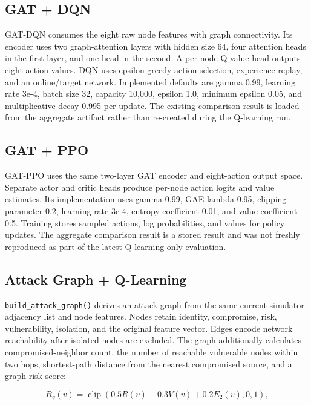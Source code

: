 \documentclass[12pt,a4paper]{report}
\newcommand{\code}[1]{\texttt{#1}}
\begin{document}
\subsection{GAT + DQN}

GAT-DQN consumes the eight raw node features with graph connectivity. Its encoder uses two graph-attention layers with hidden size 64, four attention heads in the first layer, and one head in the second. A per-node Q-value head outputs eight action values. DQN uses epsilon-greedy action selection, experience replay, and an online/target network. Implemented defaults are gamma 0.99, learning rate 3e-4, batch size 32, capacity 10,000, epsilon 1.0, minimum epsilon 0.05, and multiplicative decay 0.995 per update. The existing comparison result is loaded from the aggregate artifact rather than re-created during the Q-learning run.

\subsection{GAT + PPO}

GAT-PPO uses the same two-layer GAT encoder and eight-action output space. Separate actor and critic heads produce per-node action logits and value estimates. Its implementation uses gamma 0.99, GAE lambda 0.95, clipping parameter 0.2, learning rate 3e-4, entropy coefficient 0.01, and value coefficient 0.5. Training stores sampled actions, log probabilities, and values for policy updates. The aggregate comparison result is a stored result and was not freshly reproduced as part of the latest Q-learning-only evaluation.

\subsection{Attack Graph + Q-Learning}

\code{build\_attack\_graph()} derives an attack graph from the same current simulator adjacency list and node features. Nodes retain identity, compromise, risk, vulnerability, isolation, and the original feature vector. Edges encode network reachability after isolated nodes are excluded. The graph additionally calculates compromised-neighbor count, the number of reachable vulnerable nodes within two hops, shortest-path distance from the nearest compromised source, and a graph risk score:

\begin{equation}
R_g(v)=\operatorname{clip}\left(0.5R(v)+0.3V(v)+0.2E_2(v),0,1\right),
\end{equation}
\end{document}
